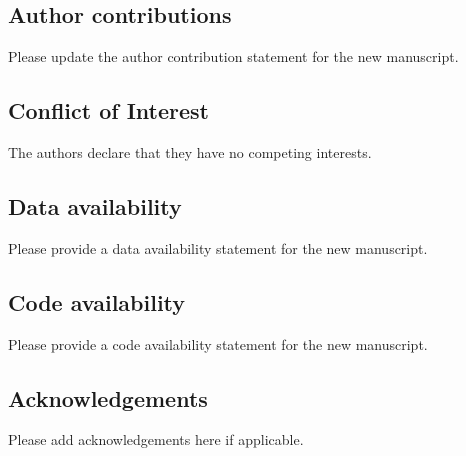 \documentclass[pdflatex,sn-mathphys-num]{sn-jnl}%
\theoremstyle{thmstyleone}%
\theoremstyle{thmstyletwo}%
\theoremstyle{thmstylethree}%
\begin{document}
\subsection{Author contributions}
Please update the author contribution statement for the new manuscript.

\subsection{Conflict of Interest}
The authors declare that they have no competing interests.

\subsection{Data availability}
Please provide a data availability statement for the new manuscript.

\subsection{Code availability}
Please provide a code availability statement for the new manuscript.

\subsection{Acknowledgements}
Please add acknowledgements here if applicable.



\end{document}
